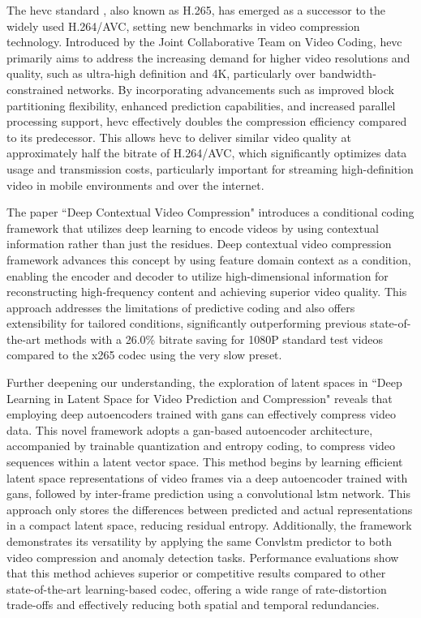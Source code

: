 The \gls{hevc} standard \cite{h265_2012}, also known as H.265, has emerged as a successor to the widely used H.264/AVC, setting new benchmarks in video compression technology. Introduced by the Joint Collaborative Team on Video Coding, \gls{hevc} primarily aims to address the increasing demand for higher video resolutions and quality, such as ultra-high definition and 4K, particularly over bandwidth-constrained networks. By incorporating advancements such as improved block partitioning flexibility, enhanced prediction capabilities, and increased parallel processing support, \gls{hevc} effectively doubles the compression efficiency compared to its predecessor. This allows \gls{hevc} to deliver similar video quality at approximately half the bitrate of H.264/AVC, which significantly optimizes data usage and transmission costs, particularly important for streaming high-definition video in mobile environments and over the internet.

The paper ``Deep Contextual Video Compression" \cite{li2021deep} introduces a conditional coding framework that utilizes deep learning to encode videos by using contextual information rather than just the residues. Deep contextual video compression framework advances this concept by using feature domain context as a condition, enabling the encoder and decoder to utilize high-dimensional information for reconstructing high-frequency content and achieving superior video quality. This approach addresses the limitations of predictive coding and also offers extensibility for tailored conditions, significantly outperforming previous state-of-the-art methods with a 26.0\% bitrate saving for 1080P standard test videos compared to the x265 \gls{codec} using the very slow preset.

Further deepening our understanding, the exploration of latent spaces in ``Deep Learning in Latent Space for Video Prediction and Compression" \cite{Liu_latentvideo} reveals that employing deep autoencoders trained with \gls{gan}s can effectively compress video data. This novel framework adopts a \gls{gan}-based autoencoder architecture, accompanied by trainable quantization and entropy coding, to compress video sequences within a latent vector space. This method begins by learning efficient latent space representations of video frames via a deep autoencoder trained with \gls{gan}s, followed by inter-frame prediction using a convolutional \gls{lstm} network. This approach only stores the differences between predicted and actual representations in a compact latent space, reducing residual entropy. Additionally, the framework demonstrates its versatility by applying the same Conv\gls{lstm} predictor to both video compression and anomaly detection tasks. Performance evaluations show that this method achieves superior or competitive results compared to other state-of-the-art learning-based \gls{codec}, offering a wide range of rate-distortion trade-offs and effectively reducing both spatial and temporal redundancies.

